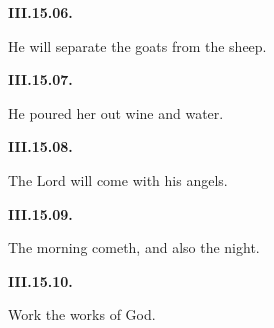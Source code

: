\par\begin{minipage}{\linewidth}\raggedright
\textbf{III.15.06.}

He will separate the goats from the sheep.

\end{minipage}\par\addvspace{4pt}

\par\begin{minipage}{\linewidth}\raggedright
\textbf{III.15.07.}

He poured her out wine and water.

\end{minipage}\par\addvspace{4pt}

\par\begin{minipage}{\linewidth}\raggedright
\textbf{III.15.08.}

The Lord will come with his angels.

\end{minipage}\par\addvspace{4pt}

\par\begin{minipage}{\linewidth}\raggedright
\textbf{III.15.09.}

The morning cometh, and also the night.

\end{minipage}\par\addvspace{4pt}

\par\begin{minipage}{\linewidth}\raggedright
\textbf{III.15.10.}

Work the works of God.

\end{minipage}\par\addvspace{4pt}

